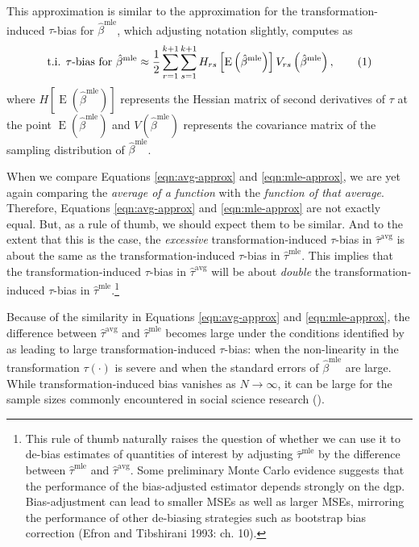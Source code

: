 \documentclass[11pt]{article}
\newcommand\numberthis{\addtocounter{equation}{1}\tag{\theequation}}
\DeclareMathOperator*{\E}{\text{E}}
\begin{document}
This approximation is similar to the approximation for the transformation-induced $\tau$-bias for $\hat{\beta}^\text{mle}$, which adjusting notation slightly, \citet[p. 405, Eq. 1]{Rainey2017} computes as
\begin{align*}
\text{t.i. } \tau \text{-bias for } \hat{\beta}^\text{mle} \approx \dfrac{1}{2} \displaystyle \sum_{r = 1}^{k+1} \sum_{s = 1}^{k+1} H_{rs}\left[ \E \left( \hat{\beta}^\text{mle} \right) \right] V_{rs} \left( \hat{\beta}^{\text{mle}} \right), \numberthis \label{eqn:mle-approx}
\end{align*}
where $H\left[ \E \left( \hat{\beta}^\text{mle} \right) \right]$ represents the Hessian matrix of second derivatives of $\tau$ at the point $\E \left( \hat{\beta}^\text{mle} \right)$ and $V \left( \hat{\beta}^{\text{mle}} \right)$ represents the covariance matrix of the sampling distribution of $\hat{\beta}^\text{mle}$.

When we compare Equations \ref{eqn:avg-approx} and \ref{eqn:mle-approx}, we are yet again comparing the \textit{average of a function} with the \textit{function of that average}.
Therefore, Equations \ref{eqn:avg-approx} and \ref{eqn:mle-approx} are not exactly equal.
But, as a rule of thumb, we should expect them to be similar.
And to the extent that this is the case, the \emph{excessive} transformation-induced $\tau$-bias in $\hat{\tau}^\text{avg}$ is about the same as the transformation-induced $\tau$-bias in $\hat{\tau}^\text{mle}$.
This implies that the transformation-induced $\tau$-bias in $\hat{\tau}^\text{avg}$ will be about \emph{double} the transformation-induced $\tau$-bias in $\hat{\tau}^\text{mle}$.\footnote{This rule of thumb naturally raises the question of whether we can use it to de-bias estimates of quantities of interest by adjusting $\hat{\tau}^\text{mle}$ by the difference between $\hat{\tau}^\text{mle}$ and $\hat{\tau}^\text{avg}$.
Some preliminary Monte Carlo evidence suggests that the performance of the bias-adjusted estimator depends strongly on the dgp.
Bias-adjustment can lead to smaller MSEs as well as larger MSEs, mirroring the performance of other de-biasing strategies such as bootstrap bias correction (Efron and Tibshirani 1993: ch. 10).}

Because of the similarity in Equations \ref{eqn:avg-approx} and \ref{eqn:mle-approx}, the difference between $\hat{\tau}^\text{avg}$ and $\hat{\tau}^\text{mle}$ becomes large under the conditions identified by \cite{Rainey2017} as leading to large transformation-induced $\tau$-bias: when the non-linearity in the transformation $\tau(\cdot)$ is severe and when the standard errors of $\hat{\beta}^\text{mle}$ are large.
While transformation-induced bias vanishes as $N \to\infty$, it can be large for the sample sizes commonly encountered in social science research (\cite{Rainey2017}).
\end{document}
